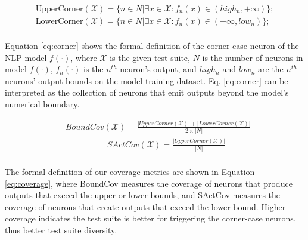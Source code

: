 \begin{equation}
\begin{split}
    \text{UpperCorner}(\mathcal{X}) = \{n \in N | \exists x \in \mathcal{X}: f_n(x) \in (high_n, +\infty)\}; \\
    \text{LowerCorner}(\mathcal{X}) = \{n \in N | \exists x \in \mathcal{X}: f_n(x) \in (-\infty, low_n)\}; \\
\end{split}
    \label{eq:corner}
\end{equation}

\noindent Equation \ref{eq:corner} shows the formal definition of the corner-case neuron of the NLP model $f(\cdot)$, where $\mathcal{X}$ is the given test suite, $N$ is the number of neurons in model $f(\cdot)$, $f_n(\cdot)$ is the $n^{th}$ neuron's output, and $high_n$ and $low_n$ are the $n^{th}$ neurons' output bounds on the model training dataset.
Eq. \ref{eq:corner} can be interpreted as the collection of neurons that emit outputs beyond the model's numerical boundary.

\begin{equation}
\begin{split}
     & BoundCov(\mathcal{X}) = \frac{|UpperCorner(\mathcal{X})| + |LowerCorner(\mathcal{X})| }{2 \times |N|} \\ 
     &\quad  \qquad \qquad  SActCov(\mathcal{X}) = \frac{|UpperCorner(\mathcal{X})|} {|N|} \\ 
\end{split}
    \label{eq:coverage}
\end{equation}

\noindent The formal definition of our coverage metrics are shown in Equation \ref{eq:coverage}, where BoundCov measures the coverage of neurons that produce outputs that exceed the upper or lower bounds, and SActCov measures the coverage of neurons that create outputs that exceed the lower bound.
Higher coverage indicates the test suite is better for triggering the corner-case neurons, thus better test suite diversity.





